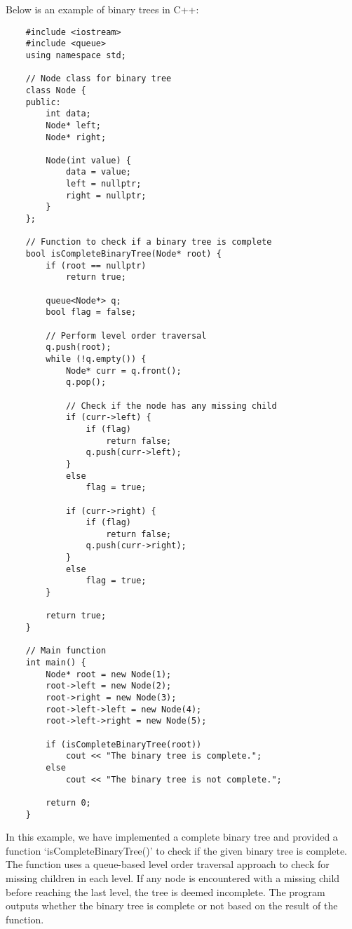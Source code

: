 \begin{solution}
    Below is an example of binary trees in C++:

    \horizontalline

    \begin{verbatim}
    #include <iostream>
    #include <queue>
    using namespace std;
    
    // Node class for binary tree
    class Node {
    public:
        int data;
        Node* left;
        Node* right;
    
        Node(int value) {
            data = value;
            left = nullptr;
            right = nullptr;
        }
    };
    
    // Function to check if a binary tree is complete
    bool isCompleteBinaryTree(Node* root) {
        if (root == nullptr)
            return true;
      
        queue<Node*> q;
        bool flag = false;
      
        // Perform level order traversal
        q.push(root);
        while (!q.empty()) {
            Node* curr = q.front();
            q.pop();
    
            // Check if the node has any missing child
            if (curr->left) {
                if (flag)
                    return false;
                q.push(curr->left);
            }
            else
                flag = true;
      
            if (curr->right) {
                if (flag)
                    return false;
                q.push(curr->right);
            }
            else
                flag = true;
        }
      
        return true;
    }
    
    // Main function
    int main() {
        Node* root = new Node(1);
        root->left = new Node(2);
        root->right = new Node(3);
        root->left->left = new Node(4);
        root->left->right = new Node(5);
      
        if (isCompleteBinaryTree(root))
            cout << "The binary tree is complete.";
        else
            cout << "The binary tree is not complete.";
      
        return 0;
    }
    \end{verbatim}

    \horizontalline

    In this example, we have implemented a complete binary tree and provided a function `isCompleteBinaryTree()' to check if the given binary tree is complete. The function uses a queue-based level order traversal approach to check for missing children in each level. If any node is encountered with a missing child before reaching the last level, 
    the tree is deemed incomplete. The program outputs whether the binary tree is complete or not based on the result of the function.


\end{solution}
